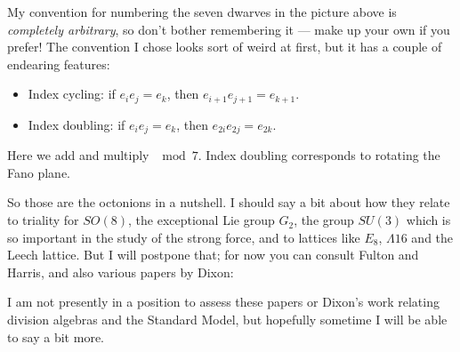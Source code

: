\documentclass{article}
\def\tightlist{}
\renewcommand{\texttt}[1]{%
  \begingroup
  \ttfamily
  \begingroup\lccode`~=`/\lowercase{\endgroup\def~}{/\discretionary{}{}{}}%
  \begingroup\lccode`~=`[\lowercase{\endgroup\def~}{[\discretionary{}{}{}}%
  \begingroup\lccode`~=`.\lowercase{\endgroup\def~}{.\discretionary{}{}{}}%
  \catcode`/=\active\catcode`[=\active\catcode`.=\active
  \scantokens{#1\noexpand}%
  \endgroup
}
\begin{document}
My convention for numbering the seven dwarves in the picture above is
\emph{completely arbitrary}, so don't bother remembering it --- make up
your own if you prefer! The convention I chose looks sort of weird at
first, but it has a couple of endearing features:

\begin{itemize}
\tightlist
\item
  Index cycling: if \(e_i e_j = e_k\), then
  \(e_{i+1} e_{j+1} = e_{k+1}\).
\item
  Index doubling: if \(e_i e_j = e_k\), then \(e_{2i} e_{2j} = e_{2k}\).
\end{itemize}

Here we add and multiply \(\mod 7\). Index doubling corresponds to
rotating the Fano plane.

So those are the octonions in a nutshell. I should say a bit about how
they relate to triality for \(SO(8)\), the exceptional Lie group
\(G_2\), the group \(SU(3)\) which is so important in the study of the
strong force, and to lattices like \(E_8\), \(\Lambda 16\) and the Leech
lattice. But I will postpone that; for now you can consult Fulton and
Harris, and also various papers by Dixon:


I am not presently in a position to assess these papers or Dixon's work
relating division algebras and the Standard Model, but hopefully
sometime I will be able to say a bit more.
\end{document}
